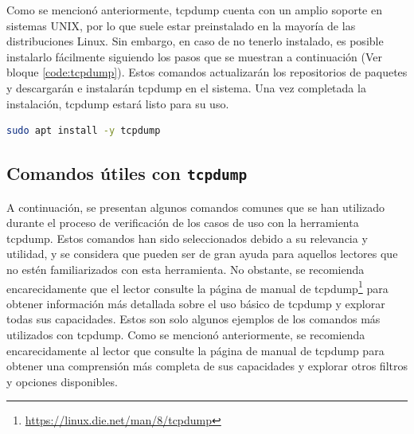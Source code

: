 Como se mencionó anteriormente, tcpdump cuenta con un amplio soporte en sistemas UNIX, por lo que suele estar preinstalado en la mayoría de las distribuciones Linux. Sin embargo, en caso de no tenerlo instalado, es posible instalarlo fácilmente siguiendo los pasos que se muestran a continuación (Ver bloque \ref{code:tcpdump}). Estos comandos actualizarán los repositorios de paquetes y descargarán e instalarán tcpdump en el sistema. Una vez completada la instalación, tcpdump estará listo para su uso.

\begin{lstlisting}[language= bash, style=Consola2, caption={Instalación del paquete Tcpdump},label=code:tcpdump]
    sudo apt install -y tcpdump
\end{lstlisting}

\subsection{Comandos útiles con \texttt{tcpdump}}


A continuación, se presentan algunos comandos comunes que se han utilizado durante el proceso de verificación de los casos de uso con la herramienta tcpdump. Estos comandos han sido seleccionados debido a su relevancia y utilidad, y se considera que pueden ser de gran ayuda para aquellos lectores que no estén familiarizados con esta herramienta. No obstante, se recomienda encarecidamente que el lector consulte la página de manual de tcpdump\footnote{\url{https://linux.die.net/man/8/tcpdump}} para obtener información más detallada sobre el uso básico de tcpdump y explorar todas sus capacidades. Estos son solo algunos ejemplos de los comandos más utilizados con tcpdump. Como se mencionó anteriormente, se recomienda encarecidamente al lector que consulte la página de manual de tcpdump para obtener una comprensión más completa de sus capacidades y explorar otros filtros y opciones disponibles.

